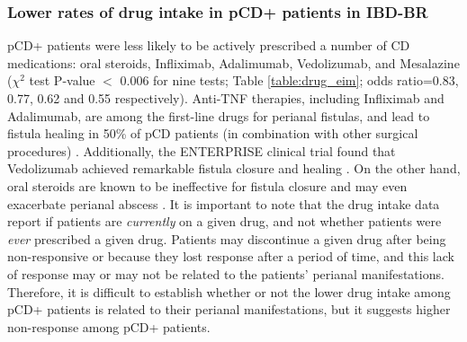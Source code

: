 \subsubsection{Lower rates of drug intake in pCD+ patients in IBD-BR}
pCD+ patients were less likely to be actively prescribed a number of CD medications: oral steroids, Infliximab, Adalimumab, Vedolizumab, and Mesalazine ($\chi^{2}$ test P-value $<$ 0.006 for nine tests; Table \ref{table:drug_eim}; odds ratio=0.83, 0.77, 0.62 and 0.55 respectively). Anti-TNF therapies, including Infliximab and Adalimumab, are among the first-line drugs for perianal fistulas, and lead to fistula healing in 50\% of pCD patients (in combination with other surgical procedures) \cite{Regueiro2003-lf,Kotze2014-fh,Haennig2015-pj,Gaertner2007-wb}. Additionally, the ENTERPRISE clinical trial found that Vedolizumab achieved remarkable fistula closure and healing \cite{Schwartz2022-zp}. On the other hand, oral steroids are known to be ineffective for fistula closure and may even exacerbate perianal abscess \cite{Jones1966-tt}. It is important to note that the drug intake data report if patients are \textit{currently} on a given drug, and not whether patients were \textit{ever} prescribed a given drug. Patients may discontinue a given drug after being non-responsive or because they lost response after a period of time, and this lack of response may or may not be related to the patients' perianal manifestations. Therefore, it is difficult to establish whether or not the lower drug intake among pCD+ patients is related to their perianal manifestations, but it suggests higher non-response among pCD+ patients. 


